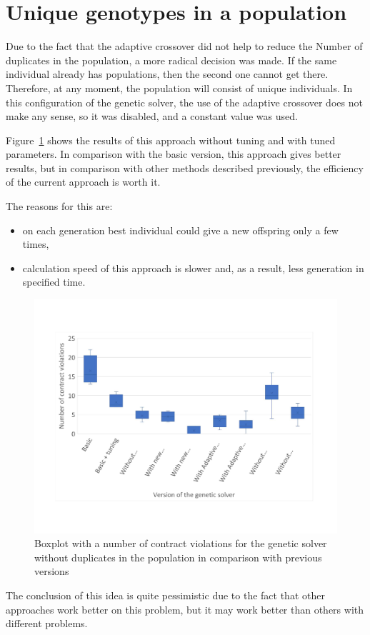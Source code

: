 \section{Unique genotypes in a population}
Due to the fact that the adaptive crossover did not help to reduce the Number of duplicates in the population, a more radical decision was made. If the same individual already has populations, then the second one cannot get there. Therefore, at any moment, the population will consist of unique individuals. In this configuration of the genetic solver, the use of the adaptive crossover does not make any sense, so it was disabled, and a constant value was used.

Figure~\ref{fig:boxplotsolverNoDuplicates} shows the results of this approach without tuning and with tuned parameters. In comparison with the basic version, this approach gives better results, but in comparison with other methods described previously, the efficiency of the current approach is worth it.

The reasons for this are:
\begin{itemize}
	\item on each generation best individual could give a new offspring only a few times, 
	\item calculation speed of this approach is slower and, as a result, less generation in specified time.
\end{itemize}


\begin{figure}
	\centering
	\includegraphics[width=\textwidth]{images/BoxPlotSolverNoDuplicates.pdf}
	\caption[Boxplot with a number of contract violations for the genetic solver without duplicates in the population in comparison with previous versions]{Boxplot with a number of contract violations for the genetic solver without duplicates in the population in comparison with previous versions}
	\label{fig:boxplotsolverNoDuplicates}
\end{figure}

The conclusion of this idea is quite pessimistic due to the fact that other approaches work better on this problem, but it may work better than others with different problems.


